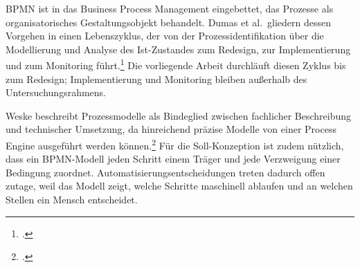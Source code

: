 BPMN ist in das Business Process Management eingebettet, das Prozesse als organisatorisches Gestaltungsobjekt behandelt. Dumas et al.~gliedern dessen Vorgehen in einen Lebenszyklus, der von der Prozessidentifikation \"uber die Modellierung und Analyse des Ist-Zustandes zum Redesign, zur Implementierung und zum Monitoring f\"uhrt.\footcite[Vgl.][S.~22--24]{Dumas2018} Die vorliegende Arbeit durchl\"auft diesen Zyklus bis zum Redesign; Implementierung und Monitoring bleiben au{\ss}erhalb des Untersuchungsrahmens.

Weske beschreibt Prozessmodelle als Bindeglied zwischen fachlicher Beschreibung und technischer Umsetzung, da hinreichend pr\"azise Modelle von einer Process Engine ausgef\"uhrt werden k\"onnen.\footcite[Vgl.][S.~4 und 123\,f.]{Weske2024} F\"ur die Soll-Konzeption ist zudem n\"utzlich, dass ein BPMN-Modell jeden Schritt einem Tr\"ager und jede Verzweigung einer Bedingung zuordnet. Automatisierungsentscheidungen treten dadurch offen zutage, weil das Modell zeigt, welche Schritte maschinell ablaufen und an welchen Stellen ein Mensch entscheidet.

